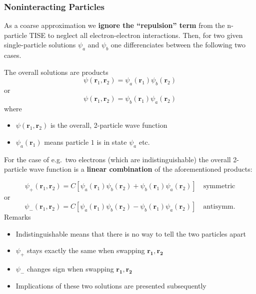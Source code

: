 \subsubsection{Noninteracting Particles}\label{ssec:NIP}
As a coarse approximation we \textbf{ignore the ``repulsion'' term} from the n-particle TISE to neglect all electron-electron interactions. Then, for two given single-particle solutions $\psi_a$ and $\psi_b$ one differenciates between the following two cases.

\newpar{}

The overall solutions are products
\begin{equation*}
    \psi(\mathbf{r}_{1},\mathbf{r}_{2})=\psi_{a}(\mathbf{r}_{1})\psi_{b}(\mathbf{r}_{2})
\end{equation*}
or
\begin{equation*}
    \psi(\mathbf{r}_{1},\mathbf{r}_{2})=\psi_{b}(\mathbf{r}_{1})\psi_{a}(\mathbf{r}_{2})
\end{equation*}
where
\begin{itemize}
    \item $\psi(\mathbf{r}_{1},\mathbf{r}_{2})$ is the overall, 2-particle wave function
    \item $\psi_{a}(\mathbf{r}_{1})$ means particle $1$ is in state $\psi_{a}$ etc.
\end{itemize}

\newpar{}

For the case of e.g.\ two electrons (which are indistinguishable) the overall 2-particle wave function is a \textbf{linear combination} of the aforementioned products:

\begin{equation*}
    \psi_{+}(\mathbf{r}_{1},\mathbf{r}_{2})=C\left[\psi_{a}(\mathbf{r}_{1})\psi_{b}(\mathbf{r}_{2})+\psi_{b}(\mathbf{r}_{1})\psi_{a}(\mathbf{r}_{2})\right]\quad \mathrm{symmetric}
\end{equation*}
or
\begin{equation*}
    \psi_{-}(\mathbf{r}_{1},\mathbf{r}_{2})=C\left[\psi_{a}(\mathbf{r}_{1})\psi_{b}(\mathbf{r}_{2})-\psi_{b}(\mathbf{r}_{1})\psi_{a}(\mathbf{r}_{2})\right]\quad \mathrm{antisymm.}
\end{equation*}
Remarks
\begin{itemize}
    \item Indistinguishable means that there is no way to  tell the two particles apart
    \item $\psi_{+}$ stays exactly the same when swapping $\mathbf{r_1},\mathbf{r_2}$
    \item $\psi_{-}$ changes sign when swapping $\mathbf{r_1},\mathbf{r_2}$
    \item Implications of these two solutions are presented subsequently
\end{itemize}

